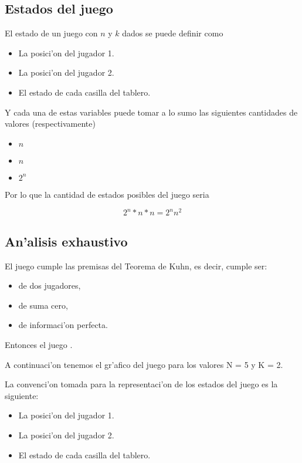\subsection{Estados del juego}
El estado de un juego con $n$ y $k$ dados se puede definir como

\begin{itemize}
\item La posici'on del jugador 1.
\item La posici'on del jugador 2.
\item El estado de cada casilla del tablero.
\end{itemize}

Y cada una de estas variables puede tomar a lo sumo las siguientes cantidades de valores (respectivamente)

\begin{itemize}
\item $n$
\item $n$
\item $2^n$
\end{itemize}

Por lo que la cantidad de estados posibles del juego seria

$$2^n * n * n = 2^n n^2$$




\subsection{An'alisis exhaustivo}
El juego cumple las premisas del Teorema de Kuhn, es decir, cumple ser:

\begin{itemize}
\item de dos jugadores,
\item de suma cero,
\item de informaci'on perfecta.
\end{itemize}

Entonces el juego .

A continuaci'on tenemos el gr'afico del juego  para los valores N = 5 y K = 2.

La convenci'on tomada para la representaci'on de los estados del juego es la siguiente:

\begin{itemize}
\item La posici'on del jugador 1.
\item La posici'on del jugador 2.
\item El estado de cada casilla del tablero.
\end{itemize}

